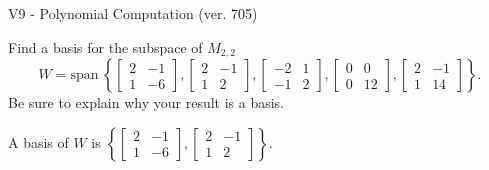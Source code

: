 \begin{exercise}
  \begin{exerciseTitle}V9 - Polynomial Computation (ver. 705)\end{exerciseTitle}
  \begin{exerciseStatement}
    Find a basis for the subspace of \(M_{2,2}\) 
\[W=\mathrm{span}\ \left\{\left[\begin{array}{cc}
2 & -1 \\
1 & -6
\end{array}\right] , \left[\begin{array}{cc}
2 & -1 \\
1 & 2
\end{array}\right] , \left[\begin{array}{cc}
-2 & 1 \\
-1 & 2
\end{array}\right] , \left[\begin{array}{cc}
0 & 0 \\
0 & 12
\end{array}\right] , \left[\begin{array}{cc}
2 & -1 \\
1 & 14
\end{array}\right]\right\}.\]
 Be sure to explain why your result is a basis.


  \end{exerciseStatement}
  \begin{exerciseAnswer}
   A basis of \(W\) is  \(\left\{\left[\begin{array}{cc}
2 & -1 \\
1 & -6
\end{array}\right] , \left[\begin{array}{cc}
2 & -1 \\
1 & 2
\end{array}\right]\right\}\).
  


  \end{exerciseAnswer}
\end{exercise}